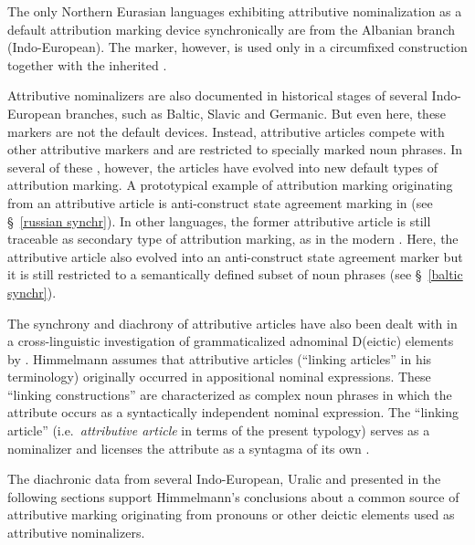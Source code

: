 The only Northern Eurasian languages exhibiting attributive nominalization as a default attribution marking device synchronically are from the Albanian branch (Indo-European). The marker, however, is used only in a circumfixed construction together with the inherited .

Attributive nominalizers are also documented in historical stages of several Indo-European branches, such as Baltic, Slavic and Germanic. But even here, these markers are not the default devices. Instead, attributive articles compete with other attributive markers and are restricted to specially marked noun phrases. In several of these , however, the articles have evolved into new default types of attribution marking. A prototypical example of attribution marking originating from an attributive article is anti\hyp{}construct state agreement marking in  (see \S~\ref{russian synchr}). In other languages, the former attributive article is still traceable as secondary type of attribution marking, as in the modern . Here, the attributive article also evolved into an anti\hyp{}construct state agreement marker but it is still restricted to a semantically defined subset of noun phrases (see \S~\ref{baltic synchr}). 

The synchrony and diachrony of attributive articles have also been dealt with in a cross-linguistic investigation of grammaticalized adnominal D(eictic) elements by \cite{himmelmann1997}. Himmelmann assumes that attributive articles (“linking articles” in his terminology) originally occurred in appositional nominal expressions. These “linking constructions” are characterized as complex noun phrases in which the attribute occurs as a syntactically independent nominal expression. The “linking article” (i.e.~\textit{attributive article} in terms of the present typology) serves as a nominalizer and licenses the attribute as a syntagma of its own \cite[188]{himmelmann1997}.

The diachronic data from several Indo-European, Uralic and  presented in the following sections support Himmelmann's conclusions about a common source of attributive marking originating from pronouns or other deictic elements used as attributive nominalizers.


